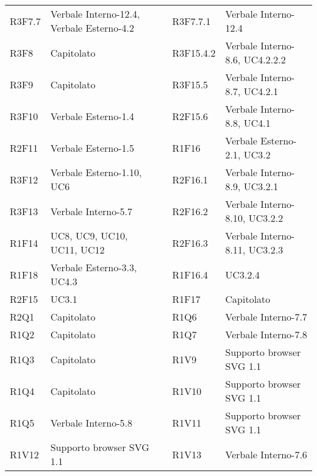 \begin{center}
\begin{longtable}{C{2cm} | C{5cm} C{0.2cm} C{2cm} | C{5cm}}
R3F7.7 & Verbale Interno-12.4, Verbale Esterno-4.2 &  & R3F7.7.1 & Verbale Interno-12.4 \\

R3F8 & Capitolato &  & R3F15.4.2 & Verbale Interno-8.6, UC4.2.2.2 \\
R3F9 & Capitolato &  & R3F15.5 & Verbale Interno-8.7, UC4.2.1 \\
R3F10 & Verbale Esterno-1.4 &  & R2F15.6 & Verbale Interno-8.8, UC4.1 \\
R2F11 & Verbale Esterno-1.5 &  & R1F16 & Verbale Esterno-2.1, UC3.2 \\
R3F12 & Verbale Esterno-1.10, UC6 &  & R2F16.1 & Verbale Interno-8.9, UC3.2.1 \\
R3F13 & Verbale Interno-5.7 &  & R2F16.2 & Verbale Interno-8.10, UC3.2.2 \\
R1F14 & UC8, UC9, UC10, UC11, UC12 &  & R2F16.3 & Verbale Interno-8.11, UC3.2.3 \\
R1F18 & Verbale Esterno-3.3, UC4.3 &  & R1F16.4 & UC3.2.4 \\
R2F15 & UC3.1 &  & R1F17 & Capitolato \\

R2Q1 & Capitolato &  & R1Q6 & Verbale Interno-7.7\\
R1Q2 & Capitolato &  & R1Q7 & Verbale Interno-7.8\\
R1Q3 & Capitolato &  & R1V9 & Supporto browser SVG 1.1\\
R1Q4 & Capitolato &  & R1V10 & Supporto browser SVG 1.1\\
R1Q5 & Verbale Interno-5.8 &  & R1V11 & Supporto browser SVG 1.1\\
R1V12 & Supporto browser SVG 1.1 &  & R1V13 & Verbale Interno-7.6\\
\end{longtable}
\end{center}



























